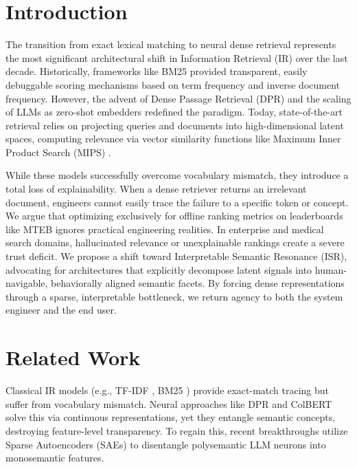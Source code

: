 \documentclass[sigconf,authordraft]{acmart}
\begin{document}


\maketitle

\section{Introduction}
The transition from exact lexical matching to neural dense retrieval represents the most significant architectural shift in Information Retrieval (IR) over the last decade. Historically, frameworks like BM25 \cite{robertson2009} provided transparent, easily debuggable scoring mechanisms based on term frequency and inverse document frequency. However, the advent of Dense Passage Retrieval (DPR) \cite{karpukhin2020} and the scaling of LLMs \cite{bendersky2023} as zero-shot embedders redefined the paradigm. Today, state-of-the-art retrieval relies on projecting queries and documents into high-dimensional latent spaces, computing relevance via vector similarity functions like Maximum Inner Product Search (MIPS) \cite{shrivastava2014}.

While these models successfully overcome vocabulary mismatch, they introduce a total loss of explainability. When a dense retriever returns an irrelevant document, engineers cannot easily trace the failure to a specific token or concept. We argue that optimizing exclusively for offline ranking metrics on leaderboards like MTEB \cite{muennighoff2023} ignores practical engineering realities. In enterprise and medical search domains, hallucinated relevance or unexplainable rankings create a severe trust deficit. We propose a shift toward Interpretable Semantic Resonance (ISR), advocating for architectures that explicitly decompose latent signals into human-navigable, behaviorally aligned semantic facets. By forcing dense representations through a sparse, interpretable bottleneck, we return agency to both the system engineer and the end user.

\section{Related Work}
Classical IR models (e.g., TF-IDF \cite{croft2010}, BM25 \cite{robertson2009}) provide exact-match tracing but suffer from vocabulary mismatch. Neural approaches like DPR \cite{karpukhin2020} and ColBERT \cite{khattab2020} solve this via continuous representations, yet they entangle semantic concepts, destroying feature-level transparency. To regain this, recent breakthroughs utilize Sparse Autoencoders (SAEs) \cite{bricken2023, cunningham2024} to disentangle polysemantic LLM neurons into monosemantic features.
\end{document}
